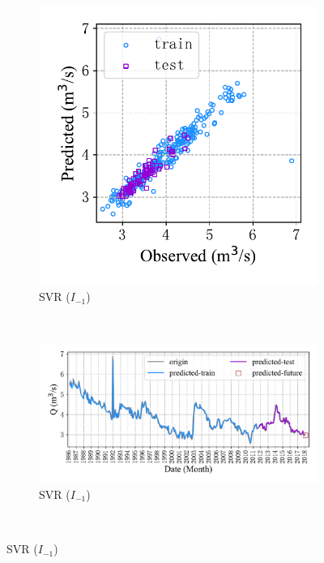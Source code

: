 \begin{figure}[!htbp]
\begin{subfigure}[b]{0.615\textwidth}
  \end{subfigure}
  \\
  \begin{subfigure}[b]{0.305\textwidth}
    \includegraphics[width=\textwidth]{Img/chap4_spr/in_only/spr_scatter_in_1_out_1_svr_only.pdf}
    \vspace{-1.2cm}
    \caption{SVR ($I_{-1}$)}
    \label{fig:spr_scatter_in_1_out_1_svr_only}
  \end{subfigure}
  ~
  \begin{subfigure}[b]{0.615\textwidth}
    \includegraphics[width=\textwidth]{Img/chap4_spr/in_only/spr_series_in_1_out_1_svr_only.pdf}
    \vspace{-1.2cm}
    \caption{SVR ($I_{-1}$)}
    \label{fig:spr_series_in_1_out_1_svr_only}
  \end{subfigure}
  \\
  \label{fig:spr_in_1_out_1_only}
\end{figure}


